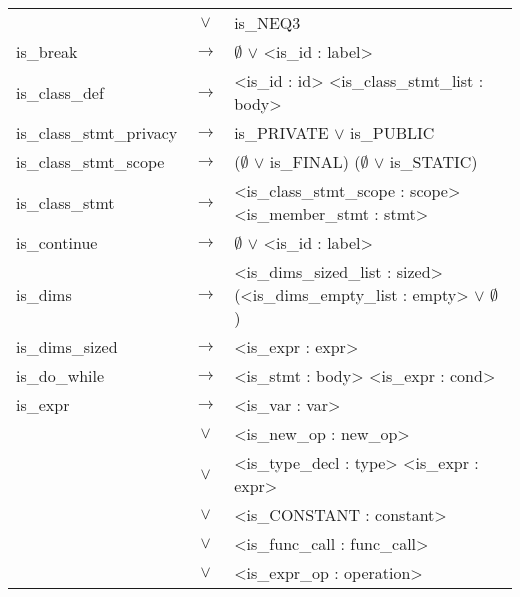\documentclass[a4paper]{article}
\begin{document}
\begin{longtable}{lcl}
								& $\vee$ & is\_NEQ3 \\
	is\_break 					& $\to$ & $\emptyset$ $\vee$ <is\_id : label> \\
	is\_class\_def				& $\to$ & <is\_id : id> <is\_class\_stmt\_list : body> \\
	is\_class\_stmt\_privacy	& $\to$ & is\_PRIVATE $\vee$ is\_PUBLIC\\	
	is\_class\_stmt\_scope		& $\to$ &($\emptyset$ $\vee$ is\_FINAL) ($\emptyset$ $\vee$ is\_STATIC) \\
	is\_class\_stmt 			& $\to$ & <is\_class\_stmt\_scope : scope> <is\_member\_stmt : stmt> \\
	is\_continue				& $\to$ & $\emptyset$ $\vee$ <is\_id : label> \\
	is\_dims					& $\to$ & <is\_dims\_sized\_list : sized> (<is\_dims\_empty\_list : empty> $\vee$ $\emptyset$) \\
	is\_dims\_sized				& $\to$ & <is\_expr : expr> \\
	is\_do\_while				& $\to$ & <is\_stmt : body> <is\_expr : cond> \\
	is\_expr					& $\to$ & <is\_var : var> \\
								& $\vee$ & <is\_new\_op : new\_op> \\
								& $\vee$ & <is\_type\_decl : type> <is\_expr : expr>\\
								& $\vee$ & <is\_CONSTANT : constant> \\
								& $\vee$ & <is\_func\_call : func\_call> \\
								& $\vee$ & <is\_expr\_op : operation> \\


\end{longtable}
\end{document}

